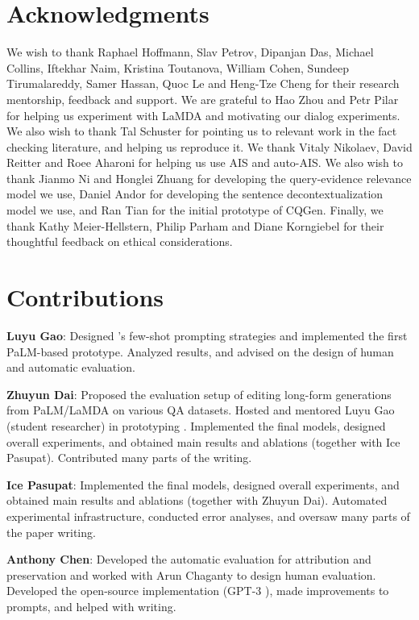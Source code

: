 \section*{Acknowledgments}

We wish to thank Raphael Hoffmann, Slav Petrov, Dipanjan Das, Michael Collins, Iftekhar Naim, Kristina Toutanova, William Cohen, Sundeep Tirumalareddy, Samer Hassan, Quoc Le and Heng-Tze Cheng for their research mentorship, feedback and support. We are grateful to Hao Zhou and Petr Pilar for helping us experiment with LaMDA and motivating our dialog experiments. We also wish to thank Tal Schuster for pointing us to relevant work in the fact checking literature, and helping us reproduce it. We thank Vitaly Nikolaev, David Reitter and Roee Aharoni for helping us use AIS and auto-AIS. We also wish to thank Jianmo Ni and Honglei Zhuang for developing the query-evidence relevance model we use, Daniel Andor for developing the sentence decontextualization model we use, and Ran Tian for the initial prototype of CQGen. Finally, we thank Kathy Meier-Hellstern, Philip Parham and Diane Korngiebel for their thoughtful feedback on ethical considerations.

\section*{Contributions}

\textbf{Luyu Gao}: Designed \approach{}'s few-shot prompting strategies and implemented the first PaLM-based prototype. Analyzed results, and advised on the design of human and automatic evaluation.

\textbf{Zhuyun Dai}: Proposed the evaluation setup of editing long-form generations from PaLM/LaMDA on various QA datasets. Hosted and mentored Luyu Gao (student researcher) in prototyping \approach{}. Implemented the final models, designed overall experiments, and obtained main results and ablations (together with Ice Pasupat). Contributed many parts of the writing.

\textbf{Ice Pasupat}: Implemented the final models, designed overall experiments, and obtained main results and ablations (together with Zhuyun Dai). Automated experimental infrastructure, conducted error analyses, and oversaw many parts of the paper writing.

\textbf{Anthony Chen}: Developed the automatic evaluation for attribution and preservation and worked with Arun Chaganty to design human evaluation. Developed the open-source implementation (GPT-3 \approach{}), made improvements to prompts, and helped with writing.

